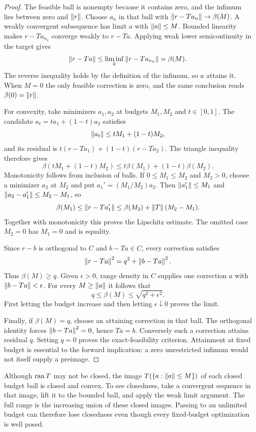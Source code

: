\begin{proof}
The feasible ball is nonempty because it contains zero, and the infimum lies between zero and $\left\lVert r\right\rVert$. Choose $a_n$ in that ball with $\left\lVert r-Ta_n\right\rVert\to\beta(M)$. A weakly convergent subsequence has limit $a$ with $\left\lVert a\right\rVert\le M$. Bounded linearity makes $r-Ta_{n_k}$ converge weakly to $r-Ta$. Applying weak lower semicontinuity in the target gives
\[
 \left\lVert r-Ta\right\rVert\le\liminf_k\left\lVert r-Ta_{n_k}\right\rVert=\beta(M).
\]
The reverse inequality holds by the definition of the infimum, so $a$ attains it. When $M=0$ the only feasible correction is zero, and the same conclusion reads $\beta(0)=\left\lVert r\right\rVert$.

For convexity, take minimizers $a_1,a_2$ at budgets $M_1,M_2$ and $t\in[0,1]$. The candidate $a_t=ta_1+(1-t)a_2$ satisfies
\[
 \left\lVert a_t\right\rVert\le tM_1+(1-t)M_2,
\]
and its residual is $t(r-Ta_1)+(1-t)(r-Ta_2)$. The triangle inequality therefore gives
\[
 \beta(tM_1+(1-t)M_2)\le t\beta(M_1)+(1-t)\beta(M_2).
\]
Monotonicity follows from inclusion of balls. If $0\le M_1\le M_2$ and $M_2>0$, choose a minimizer $a_2$ at $M_2$ and put $a_1'=(M_1/M_2)a_2$. Then $\left\lVert a_1'\right\rVert\le M_1$ and $\left\lVert a_2-a_1'\right\rVert\le M_2-M_1$, so
\[
 \beta(M_1)\le\left\lVert r-Ta_1'\right\rVert
 \le\beta(M_2)+\left\lVert T\right\rVert(M_2-M_1).
\]
Together with monotonicity this proves the Lipschitz estimate. The omitted case $M_2=0$ has $M_1=0$ and is equality.

Since $r-b$ is orthogonal to $C$ and $b-Ta\in C$, every correction satisfies
\begin{equation}\label{eq:range-decomposition}
 \left\lVert r-Ta\right\rVert^2=q^2+\left\lVert b-Ta\right\rVert^2.
\end{equation}
Thus $\beta(M)\ge q$. Given $\epsilon>0$, range density in $C$ supplies one correction $a$ with $\left\lVert b-Ta\right\rVert<\epsilon$. For every $M\ge\left\lVert a\right\rVert$ it follows that
\[
 q\le\beta(M)\le\sqrt{q^2+\epsilon^2}.
\]
First letting the budget increase and then letting $\epsilon\downarrow0$ proves the limit.

Finally, if $\beta(M)=q$, choose an attaining correction in that ball. The orthogonal identity forces $\left\lVert b-Ta\right\rVert^2=0$, hence $Ta=b$. Conversely such a correction attains residual $q$. Setting $q=0$ proves the exact-feasibility criterion. Attainment at fixed budget is essential to the forward implication: a zero unrestricted infimum would not itself supply a preimage.
\end{proof}

Although $\operatorname{ran} T$ may not be closed, the image $T(\{a:\left\lVert a\right\rVert\le M\})$ of each closed budget ball is closed and convex. To see closedness, take a convergent sequence in that image, lift it to the bounded ball, and apply the weak limit argument. The full range is the increasing union of these closed images. Passing to an unlimited budget can therefore lose closedness even though every fixed-budget optimization is well posed.

